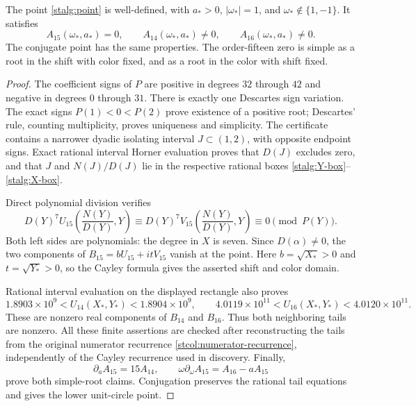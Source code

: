 \begin{theorem}
\label{stalg:zero}
The point \eqref{stalg:point} is well-defined, with
$a_*>0$, $|\omega_*|=1$, and $\omega_*\notin\{1,-1\}$.
It satisfies
\begin{equation}\label{stalg:three-tails}
 A_{15}(\omega_*,a_*)=0,\qquad
 A_{14}(\omega_*,a_*)\ne0,\qquad
 A_{16}(\omega_*,a_*)\ne0.
\end{equation}
The conjugate point has the same properties.  The order-fifteen zero
is simple as a root in the shift with color fixed, and as a root in
the color with shift fixed.
\end{theorem}
\begin{proof}
The coefficient signs of $P$ are positive in degrees $32$ through $42$
and negative in degrees $0$ through $31$.  There is exactly one
Descartes sign variation.  The exact signs $P(1)<0<P(2)$ prove existence
of a positive root; Descartes' rule, counting multiplicity, proves
uniqueness and simplicity.  The certificate contains a narrower
dyadic isolating interval $J\subset(1,2)$, with opposite endpoint signs.
Exact rational interval Horner evaluation proves that $D(J)$ excludes
zero, and that $J$ and $N(J)/D(J)$ lie in the respective rational
boxes \eqref{stalg:Y-box}--\eqref{stalg:X-box}.

Direct polynomial division verifies
\begin{equation}\label{stalg:modular}
 D(Y)^7 U_{15}\!\left(\frac{N(Y)}{D(Y)},Y\right)
 \equiv
 D(Y)^7 V_{15}\!\left(\frac{N(Y)}{D(Y)},Y\right)
 \equiv0\pmod{P(Y)}.
\end{equation}
Both left sides are polynomials: the degree in $X$ is seven.
Since $D(\alpha)\ne0$, the two components of
$B_{15}=bU_{15}+itV_{15}$ vanish at the point.  Here
$b=\sqrt{X_*}>0$ and $t=\sqrt{Y_*}>0$, so the Cayley formula gives
the asserted shift and color domain.

Rational interval evaluation on the displayed rectangle also proves
\[
 1.8903\times10^9<U_{14}(X_*,Y_*)<1.8904\times10^9,
 \qquad
 4.0119\times10^{11}<U_{16}(X_*,Y_*)<4.0120\times10^{11}.
\]
These are nonzero real components of $B_{14}$ and $B_{16}$.
Thus both neighboring tails are nonzero.  All these finite assertions
are checked after reconstructing the tails from the original numerator
recurrence \eqref{stcol:numerator-recurrence}, independently of the
Cayley recurrence used in discovery.  Finally,
\[
 \partial_aA_{15}=15A_{14},\qquad
 \omega\partial_\omega A_{15}=A_{16}-aA_{15}
\]
prove both simple-root claims.  Conjugation preserves the rational
tail equations and gives the lower unit-circle point.
\end{proof}

